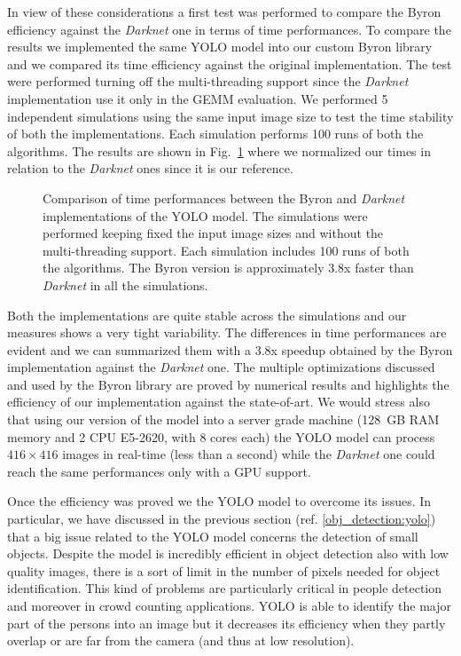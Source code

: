 \documentclass{standalone}
\begin{document}
In view of these considerations a first test was performed to compare the \textsf{Byron} efficiency against the \emph{Darknet} one in terms of time performances.
To compare the results we implemented the same YOLO model into our custom \textsf{Byron} library and we compared its time efficiency against the original implementation.
The test were performed turning off the multi-threading support since the \emph{Darknet} implementation use it only in the GEMM evaluation.
We performed 5 independent simulations using the same input image size to test the time stability of both the implementations.
Each simulation performs 100 runs of both the algorithms.
The results are shown in Fig.~\ref{fig:yolo_time} where we normalized our times in relation to the \emph{Darknet} ones since it is our reference.

\begin{figure}[htbp]
\centering
\def\svgwidth{0.85\textwidth}

\caption{Comparison of time performances between the \textsf{Byron} and \emph{Darknet} implementations of the YOLO model.
The simulations were performed keeping fixed the input image sizes and without the multi-threading support.
Each simulation includes 100 runs of both the algorithms.
The \textsf{Byron} version is approximately 3.8x faster than \emph{Darknet} in all the simulations.
}
\label{fig:yolo_time}
\end{figure}

Both the implementations are quite stable across the simulations and our measures shows a very tight variability.
The differences in time performances are evident and we can summarized them with a 3.8x speedup obtained by the \textsf{Byron} implementation against the \emph{Darknet} one.
The multiple optimizations discussed and used by the \textsf{Byron} library are proved by numerical results and highlights the efficiency of our implementation against the state-of-art.
We would stress also that using our version of the model into a server grade machine (128~GB RAM memory and 2 CPU E5-2620, with 8 cores each) the YOLO model can process $416\times416$ images in real-time (less than a second) while the \emph{Darknet} one could reach the same performances only with a GPU support.

Once the efficiency was proved we  the YOLO model to overcome its issues.
In particular, we have discussed in the previous section (ref. \ref{obj_detection:yolo}) that a big issue related to the YOLO model concerns the detection of small objects.
Despite the model is incredibly efficient in object detection also with low quality images, there is a sort of limit in the number of pixels needed for object identification.
This kind of problems are particularly critical in people detection and moreover in crowd counting applications.
YOLO is able to identify the major part of the persons into an image but it decreases its efficiency when they partly overlap or are far from the camera (and thus at low resolution).
\end{document}
